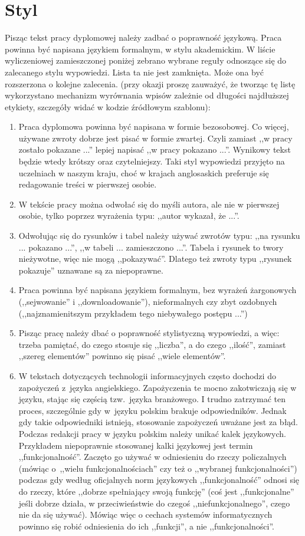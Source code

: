 \section{Styl}
\label{sec:Styl}
Pisząc tekst pracy dyplomowej należy zadbać o poprawność językową. Praca powinna być napisana językiem formalnym, w stylu akademickim. W liście wyliczeniowej zamieszczonej poniżej zebrano wybrane reguły odnoszące się do zalecanego stylu wypowiedzi. Lista ta nie jest zamknięta. Może ona być rozszerzona o kolejne zalecenia. 
(przy okazji proszę zauważyć, że tworząc tę listę wykorzystano mechanizm wyrównania wpisów zależnie od długości najdłuższej etykiety, szczegóły widać w kodzie źródłowym szablonu):
\begin{enumerate}[labelwidth=\widthof{\ref{last-item}},label=\arabic*.]
\item Praca dyplomowa powinna być napisana w  formie bezosobowej. Co więcej, używane zwroty dobrze jest pisać w formie zwartej. Czyli zamiast ,,w pracy zostało pokazane ...'' lepiej napisać ,,w pracy pokazano ...''. Wynikowy tekst będzie wtedy krótszy oraz czytelniejszy. Taki styl wypowiedzi przyjęto na uczelniach w naszym kraju, choć w krajach anglosaskich preferuje się redagowanie treści w pierwszej osobie.
\item W tekście pracy można odwołać się do myśli autora, ale nie w pierwszej osobie, tylko poprzez wyrażenia typu: ,,autor wykazał, że ...''. 
\item Odwołując się do rysunków i tabel należy używać zwrotów typu: ,,na rysunku ... pokazano ...'', ,,w tabeli ... zamieszczono ...''.  Tabela i rysunek to twory nieżywotne, więc nie mogą ,,pokazywać''. Dlatego też zwroty typu ,,rysunek pokazuje'' uznawane są za niepoprawne.
\item Praca powinna być napisana językiem formalnym, bez wyrażeń żargonowych (,,sejwowanie'' i ,,downloadowanie''), nieformalnych czy zbyt ozdobnych (,,najznamienitszym przykładem tego niebywałego postępu ...'')
\item Pisząc pracę należy dbać o poprawność stylistyczną wypowiedzi, a więc: trzeba pamiętać, do czego stosuje się ,,liczba'', a do czego ,,ilość'', zamiast ,,szereg elementów'' powinno się pisać ,,wiele elementów''.
\item W tekstach dotyczących technologii informacyjnych często dochodzi do zapożyczeń z~języka angielskiego. Zapożyczenia te mocno zakotwiczają się w języku, stając się częścią tzw.\ języka branżowego. I trudno zatrzymać ten proces, szczególnie gdy w~języku polskim brakuje odpowiedników. Jednak gdy takie odpowiedniki istnieją, stosowanie zapożyczeń uważane jest za błąd. Podczas redakcji pracy w języku polskim należy unikać kalek językowych. Przykładem niepoprawnie stosowanej kalki językowej jest termin ,,funkcjonalność''. Zaczęto go używać w odniesieniu do rzeczy policzalnych (mówiąc o~,,wielu funkcjonalnościach'' czy też o ,,wybranej funkcjonalności'') podczas gdy według oficjalnych norm językowych ,,funkcjonalność'' odnosi się do rzeczy, które ,,dobrze spełniający swoją funkcję'' (coś jest ,,funkcjonalne'' jeśli dobrze działa, w przeciwieństwie do czegoś ,,niefunkcjonalnego'', czego nie da się używać). Mówiąc więc o cechach systemów informatycznych powinno się robić odniesienia do ich ,,funkcji'', a nie ,,funkcjonalności''. 

\end{enumerate}
